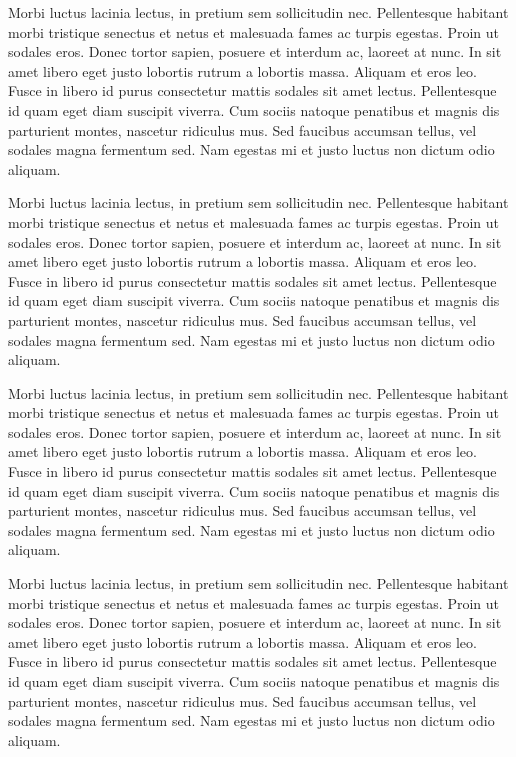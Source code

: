 {\narrower
{}
\startrule
Morbi luctus lacinia lectus, in pretium sem sollicitudin
nec. Pellentesque habitant morbi tristique senectus et netus et
malesuada fames ac turpis egestas. Proin ut sodales eros. Donec tortor
sapien, posuere et interdum ac, laoreet at nunc. In sit amet libero
eget justo lobortis rutrum a lobortis massa. Aliquam et eros
leo. Fusce in libero id purus consectetur mattis sodales sit amet
lectus. Pellentesque id quam eget diam suscipit viverra. Cum sociis
natoque penatibus et magnis dis parturient montes, nascetur ridiculus
mus. Sed faucibus accumsan tellus, vel sodales magna fermentum
sed. Nam egestas mi et justo luctus non dictum odio aliquam.

Morbi luctus lacinia lectus, in pretium sem sollicitudin
nec. Pellentesque habitant morbi tristique senectus et netus et
malesuada fames ac turpis egestas. Proin ut sodales eros. Donec tortor
sapien, posuere et interdum ac, laoreet at nunc. In sit amet libero
eget justo lobortis rutrum a lobortis massa. Aliquam et eros
leo. Fusce in libero id purus consectetur mattis sodales sit amet
lectus. Pellentesque id quam eget diam suscipit viverra. Cum sociis
natoque penatibus et magnis dis parturient montes, nascetur ridiculus
mus. Sed faucibus accumsan tellus, vel sodales magna fermentum
sed. Nam egestas mi et justo luctus non dictum odio aliquam.

Morbi luctus lacinia lectus, in pretium sem sollicitudin
nec. Pellentesque habitant morbi tristique senectus et netus et
malesuada fames ac turpis egestas. Proin ut sodales eros. Donec tortor
sapien, posuere et interdum ac, laoreet at nunc. In sit amet libero
eget justo lobortis rutrum a lobortis massa. Aliquam et eros
leo. Fusce in libero id purus consectetur mattis sodales sit amet
lectus. Pellentesque id quam eget diam suscipit viverra. Cum sociis
natoque penatibus et magnis dis parturient montes, nascetur ridiculus
mus. Sed faucibus accumsan tellus, vel sodales magna fermentum
sed. Nam egestas mi et justo luctus non dictum odio aliquam.

Morbi luctus lacinia lectus, in pretium sem sollicitudin
nec. Pellentesque habitant morbi tristique senectus et netus et
malesuada fames ac turpis egestas. Proin ut sodales eros. Donec tortor
sapien, posuere et interdum ac, laoreet at nunc. In sit amet libero
eget justo lobortis rutrum a lobortis massa. Aliquam et eros
leo. Fusce in libero id purus consectetur mattis sodales sit amet
lectus. Pellentesque id quam eget diam suscipit viverra. Cum sociis
natoque penatibus et magnis dis parturient montes, nascetur ridiculus
mus. Sed faucibus accumsan tellus, vel sodales magna fermentum
sed. Nam egestas mi et justo luctus non dictum odio aliquam.

\endrule

}

